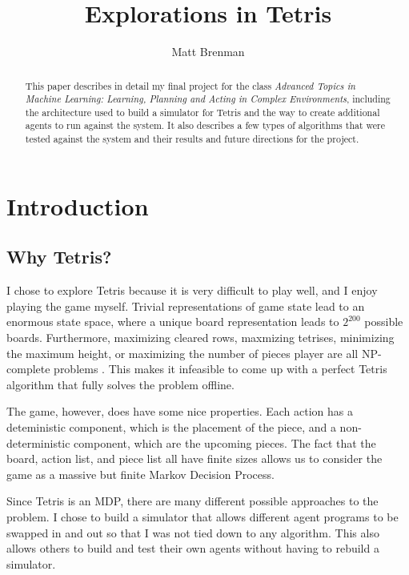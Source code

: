 \documentclass{article}
\begin{document}
\title{Explorations in Tetris}
\author{Matt Brenman}

\maketitle

\begin{abstract}
This paper describes in detail my final project for the class {\em Advanced Topics in Machine Learning: Learning, Planning and Acting in Complex Environments}, including the architecture used to build a simulator for Tetris and the way to create additional agents to run against the system. It also describes a few types of algorithms that were tested against the system and their results and future directions for the project.
\end{abstract}

\clearpage

\setcounter{tocdepth}{2}
\tableofcontents

\clearpage

\section{Introduction}

\subsection{Why Tetris?}
I chose to explore Tetris because it is very difficult to play well, and I enjoy playing the game myself. Trivial representations of game state lead to an enormous state space, where a unique board representation leads to $2^{200}$ possible boards. Furthermore, maximizing cleared rows, maxmizing tetrises, minimizing the maximum height, or maximizing the number of pieces player are all NP-complete problems \cite{NPHard}. This makes it infeasible to come up with a perfect Tetris algorithm that fully solves the problem offline. 

The game, however, does have some nice properties. Each action has a deteministic component, which is the placement of the piece, and a non-deterministic component, which are the upcoming pieces. The fact that the board, action list, and piece list all have finite sizes allows us to consider the game as a massive but finite Markov Decision Process.

Since Tetris is an MDP, there are many different possible approaches to the problem. I chose to build a simulator that allows different agent programs to be swapped in and out so that I was not tied down to any algorithm. This also allows others to build and test their own agents without having to rebuild a simulator.
\end{document}
